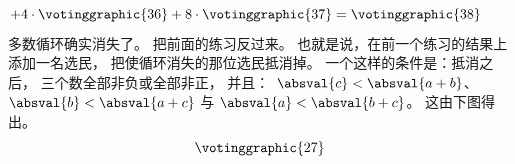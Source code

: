 \begin{exercises}
\begin{answer}
\begin{exparts}
\begin{equation*}
         +4\cdot\votinggraphic{36}
         +8\cdot\votinggraphic{37}
         =\votinggraphic{38}
      \tag*{}\end{equation*}
       多数循环确实消失了。
      \partsitem 把前面的练习反过来。
         也就是说，在前一个练习的结果上添加一名选民，
         把使循环消失的那位选民抵消掉。 
      \partsitem 一个这样的条件是：抵消之后，
         三个数全部非负或全部非正，
         并且：~$\absval{c}<\absval{a+b}$、$\absval{b}<\absval{a+c}$ 
         与 $\absval{a}<\absval{b+c}$。
         这由下图得出。 
         \begin{equation*}
           \votinggraphic{27}  %

\end{equation*}
\end{exparts}
\end{answer}
\end{exercises}
